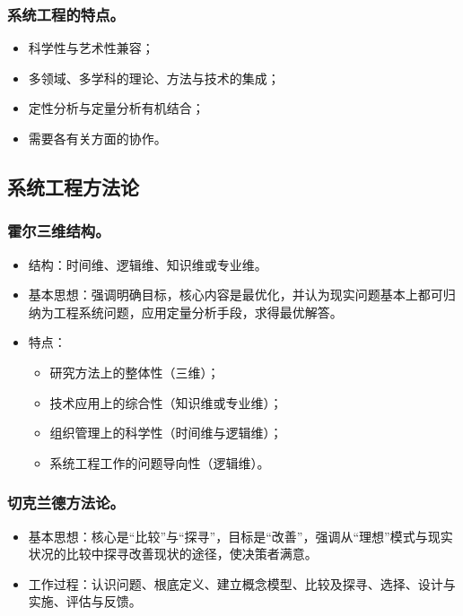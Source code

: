 \documentclass{article}
\begin{document}
\subsubsection{系统工程的特点。}
\begin{itemize}
    \item 科学性与艺术性兼容；
    \item 多领域、多学科的理论、方法与技术的集成；
    \item 定性分析与定量分析有机结合；
    \item 需要各有关方面的协作。
\end{itemize}

\subsection{系统工程方法论}

\subsubsection{霍尔三维结构。}
\begin{itemize}
    \item 结构：时间维、逻辑维、知识维或专业维。
    \item 基本思想：强调明确目标，核心内容是最优化，并认为现实问题基本上都可归纳为工程系统问题，应用定量分析手段，求得最优解答。
    \item 特点：
    \begin{itemize}
        \item 研究方法上的整体性（三维）；
        \item 技术应用上的综合性（知识维或专业维）；
        \item 组织管理上的科学性（时间维与逻辑维）；
        \item 系统工程工作的问题导向性（逻辑维）。
    \end{itemize}
\end{itemize}

\subsubsection{切克兰德方法论。}
\begin{itemize}
    \item 基本思想：核心是“比较”与“探寻”，目标是“改善”，强调从“理想”模式与现实状况的比较中探寻改善现状的途径，使决策者满意。
    \item 工作过程：认识问题、根底定义、建立概念模型、比较及探寻、选择、设计与实施、评估与反馈。
\end{itemize}
\end{document}
